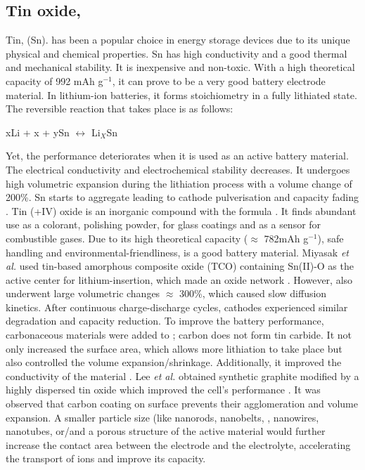\subsection*{Tin oxide, }
Tin, (Sn). has been a popular choice in energy storage devices due to its unique physical and chemical properties. Sn has high conductivity and a good thermal and mechanical stability. It is inexpensive and non-toxic. With a high theoretical capacity of 992 mAh g$^{-1}$, it can prove to be a very good battery electrode material. In lithium-ion batteries, it forms  stoichiometry in a fully lithiated state. The reversible reaction that takes place is as follows:
\begin{center}
    xLi + x + ySn $\longleftrightarrow$ Li$_X$Sn  
\end{center}
Yet, the performance deteriorates when it is used as an active battery material. The electrical conductivity and electrochemical stability decreases. It undergoes high volumetric expansion during the lithiation process with a volume change of 200\%. Sn starts to aggregate leading to cathode pulverisation and capacity fading \cite{park_effect_2008, zhao_tin-based_2016}.  
Tin (+IV) oxide is an inorganic compound with the formula . It finds abundant use as a colorant, polishing powder, for glass coatings and as a sensor for combustible gases. Due to its high theoretical capacity ($\approx$ 782mAh g$^{-1}$), safe handling and environmental-friendliness,  is a good battery material. Miyasak \textit{et al.} used tin-based amorphous composite oxide (TCO) containing Sn(II)-O as the active center for lithium-insertion, which made an oxide network \cite{idota_tin-based_1997}. However,  also underwent large volumetric changes $\approx$ 300{\%}, which caused slow diffusion kinetics. After continuous charge-discharge cycles, cathodes experienced similar degradation and capacity reduction. To improve the battery performance, carbonaceous materials were added to ; carbon does not form tin carbide. It not only increased the surface area, which allows more lithiation to take place but also controlled the volume expansion/shrinkage. Additionally, it improved the conductivity of the material \cite{nowak_composites_2018}. Lee \textit{et al.} obtained synthetic graphite modified by a highly dispersed tin oxide which improved the cell's performance \cite{navarro-suarez_2d_nodate}. 
It was observed that carbon coating on  surface prevents their agglomeration and volume expansion. A smaller particle size (like nanorods\cite{liu_direct_2009}, nanobelts\cite{duan_single_2005}, , nanowires\cite{huang_situ_2010}, nanotubes\cite{wang_large-scale_2011}, or/and a porous structure of the active material would further increase the contact area between the electrode and the electrolyte, accelerating the transport of ions and improve its capacity. 
